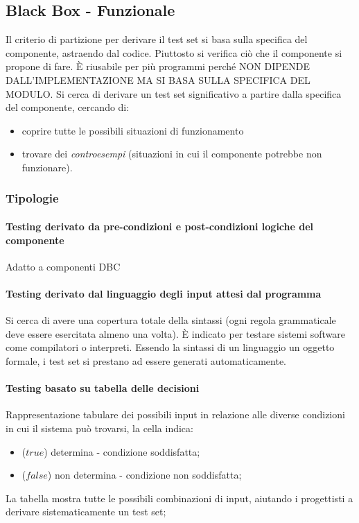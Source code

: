 \subsection{Black Box - Funzionale}

Il criterio di partizione per derivare il test set si basa sulla specifica del componente, astraendo dal codice. Piuttosto si verifica ciò che il componente si propone di fare. È riusabile per più programmi perché NON DIPENDE DALL'IMPLEMENTAZIONE MA SI BASA SULLA SPECIFICA DEL MODULO. Si cerca di derivare un test set significativo a partire dalla specifica del componente, cercando di:
\begin{itemize}
    \item coprire tutte le possibili situazioni di funzionamento
    \item trovare dei \textit{controesempi} (situazioni in cui il componente potrebbe non funzionare). 
\end{itemize}

\subsubsection{Tipologie}

\paragraph{Testing derivato da pre-condizioni e post-condizioni logiche del componente} Adatto a componenti DBC

\paragraph{Testing derivato dal linguaggio degli input attesi dal programma} Si cerca di avere una copertura totale della sintassi (ogni regola grammaticale deve essere esercitata almeno una volta). È indicato per testare sistemi software come compilatori o interpreti. Essendo la sintassi di un linguaggio un oggetto formale, i test set si prestano ad essere generati automaticamente.

\paragraph{Testing basato su tabella delle decisioni} Rappresentazione tabulare dei possibili input in relazione alle diverse condizioni in cui il sistema può trovarsi, la cella indica:
\begin{itemize}
    \item ($true$) determina - condizione soddisfatta;
	\item ($false$) non determina - condizione non soddisfatta;
\end{itemize}
La tabella mostra tutte le possibili combinazioni di input, aiutando i progettisti a derivare sistematicamente un test set;

